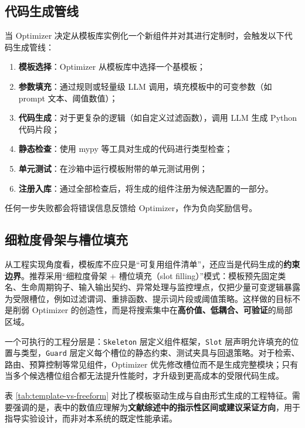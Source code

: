 \subsection{代码生成管线}

当 Optimizer 决定从模板库实例化一个新组件并对其进行定制时，会触发以下代码生成管线：

\begin{enumerate}
    \item \textbf{模板选择}：Optimizer 从模板库中选择一个基模板；
    \item \textbf{参数填充}：通过规则或轻量级 LLM 调用，填充模板中的可变参数（如 prompt 文本、阈值数值）；
    \item \textbf{代码生成}：对于更复杂的逻辑（如自定义过滤函数），调用 LLM 生成 Python 代码片段；
    \item \textbf{静态检查}：使用 mypy 等工具对生成的代码进行类型检查；
    \item \textbf{单元测试}：在沙箱中运行模板附带的单元测试用例；
    \item \textbf{注册入库}：通过全部检查后，将生成的组件注册为候选配置的一部分。
\end{enumerate}

任何一步失败都会将错误信息反馈给 Optimizer，作为负向奖励信号。

\subsection{细粒度骨架与槽位填充}

从工程实现角度看，模板库不应只是“可复用组件清单”，还应当是代码生成的\textbf{约束边界}。推荐采用“细粒度骨架 + 槽位填充（slot filling）”模式：模板预先固定类名、生命周期钩子、输入输出契约、异常处理与监控埋点，仅把少量可变逻辑暴露为受限槽位，例如过滤谓词、重排函数、提示词片段或阈值策略。这样做的目标不是削弱 Optimizer 的创造性，而是将搜索集中在\textbf{高价值、低耦合、可验证}的局部区域。

一个可执行的工程分层是：\texttt{Skeleton} 层定义组件框架，\texttt{Slot} 层声明允许填充的位置与类型，\texttt{Guard} 层定义每个槽位的静态约束、测试夹具与回退策略。对于检索、路由、预算控制等常见组件，Optimizer 优先修改槽位而不是生成完整模块；只有当多个候选槽位组合都无法提升性能时，才升级到更高成本的受限代码生成。

表 \ref{tab:template-vs-freeform} 对比了模板驱动生成与自由形式生成的工程特征。需要强调的是，表中的数值应理解为\textbf{文献综述中的指示性区间或建议采证方向}，用于指导实验设计，而非对本系统的既定性能承诺。

